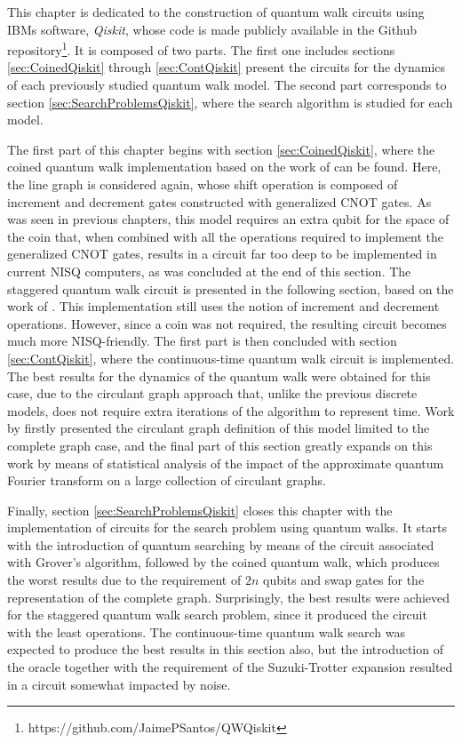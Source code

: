 \documentclass[../../dissertation.tex]{subfiles}
\begin{document}
This chapter is dedicated to the construction of quantum walk circuits using
IBMs software, \textit{Qiskit}, whose code is made publicly available in the
Github repository\footnote{https://github.com/JaimePSantos/QWQiskit}. It is
composed of two parts. The first one includes sections \ref{sec:CoinedQiskit}
through \ref{sec:ContQiskit} present the circuits for the dynamics of each
previously studied quantum walk model. The second part corresponds to section
\ref{sec:SearchProblemsQiskit}, where the search algorithm is studied for each
model.\par 

The first part of this chapter begins with section \ref{sec:CoinedQiskit},
where the coined quantum walk implementation based on the work of
\cite{douglaswang07} can be found. Here, the line graph is considered again,
whose shift operation is composed of increment and decrement gates constructed
with generalized CNOT gates. As was seen in previous chapters, this model
requires an extra qubit for the space of the coin that, when combined with all
the operations required to implement the generalized CNOT gates, results in a
circuit far too deep to be implemented in current NISQ computers, as was
concluded at the end of this section. The staggered quantum walk circuit is
presented in the following section, based on the work of \cite{acasiete2020}.
This implementation still uses the notion of increment and decrement
operations. However, since a coin was not required, the resulting circuit
becomes much more NISQ-friendly. The first part is then concluded with section
\ref{sec:ContQiskit}, where the continuous-time quantum walk circuit is
implemented. The best results for the dynamics of the quantum walk were
obtained for this case, due to the circulant graph approach that, unlike the
previous discrete models, does not require extra iterations of the algorithm to
represent time. Work by \cite{qiang2016} firstly presented the circulant graph
definition of this model limited to the complete graph case, and the final part
of this section greatly expands on this work by means of statistical analysis
of the impact of the approximate quantum Fourier transform on a large
collection of circulant graphs.\par

Finally, section \ref{sec:SearchProblemsQiskit} closes this chapter with the
implementation of circuits for the search problem using quantum walks. It
starts with the introduction of quantum searching by means of the circuit
associated with Grover's algorithm, followed by the coined quantum walk, which
produces the worst results due to the requirement of $2n$ qubits and swap gates
for the representation of the complete graph. Surprisingly, the best results
were achieved for the staggered quantum walk search problem, since it produced
the circuit with the least operations. The continuous-time quantum walk search
was expected to produce the best results in this section also, but the
introduction of the oracle together with the requirement of the Suzuki-Trotter
expansion resulted in a circuit somewhat impacted by noise.
\end{document}

